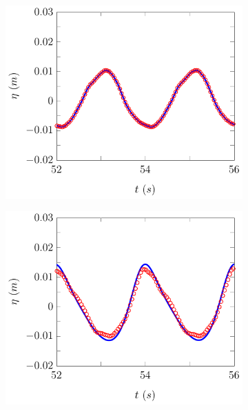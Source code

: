 \begin{figure}
	\centering
	\begin{subfigure}{0.5\textwidth}
		\includegraphics[width=\textwidth]{./chp6/figures/Experiment/Beji/sl/FEVMWG1.pdf}
		\vspace{0.5cm}
	\end{subfigure}%
	\begin{subfigure}{0.5\textwidth}
		\includegraphics[width=\textwidth]{./chp6/figures/Experiment/Beji/sl/FEVMWG2.pdf}
		\vspace{0.5cm}

\end{subfigure}
\end{figure}

